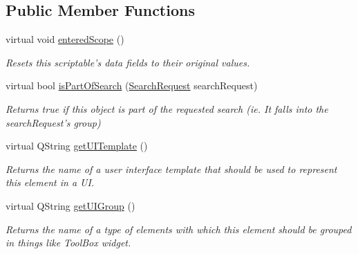 \subsection*{Public Member Functions}
\begin{DoxyCompactItemize}
\item 
virtual void \hyperlink{class_picto_1_1_analysis_variable_a0c55ee4a17dff849fb11bdb2c1c6a07a}{entered\-Scope} ()
\begin{DoxyCompactList}\small\item\em Resets this scriptable's data fields to their original values. \end{DoxyCompactList}\item 
virtual bool \hyperlink{class_picto_1_1_analysis_variable_a980469363411614e8f335ea4401308fb}{is\-Part\-Of\-Search} (\hyperlink{struct_search_request}{Search\-Request} search\-Request)
\begin{DoxyCompactList}\small\item\em Returns true if this object is part of the requested search (ie. It falls into the search\-Request's group) \end{DoxyCompactList}\item 
\hypertarget{class_picto_1_1_analysis_variable_ab47386056bb1150764473835ac30b13c}{virtual Q\-String \hyperlink{class_picto_1_1_analysis_variable_ab47386056bb1150764473835ac30b13c}{get\-U\-I\-Template} ()}\label{class_picto_1_1_analysis_variable_ab47386056bb1150764473835ac30b13c}

\begin{DoxyCompactList}\small\item\em Returns the name of a user interface template that should be used to represent this element in a U\-I. \end{DoxyCompactList}\item 
\hypertarget{class_picto_1_1_analysis_variable_a7f8adaf6bc5f2041ce5078f68e5db077}{virtual Q\-String \hyperlink{class_picto_1_1_analysis_variable_a7f8adaf6bc5f2041ce5078f68e5db077}{get\-U\-I\-Group} ()}\label{class_picto_1_1_analysis_variable_a7f8adaf6bc5f2041ce5078f68e5db077}

\begin{DoxyCompactList}\small\item\em Returns the name of a type of elements with which this element should be grouped in things like Tool\-Box widget. \end{DoxyCompactList}\end{DoxyCompactItemize}
